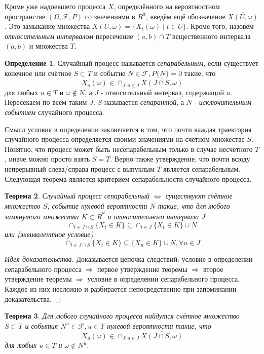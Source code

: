 \documentclass[16pt]{article}
\newtheorem{theorem}{Теорема}[section]
\theoremstyle{definition}
\newtheorem{definition}[theorem]{Определение}
\begin{document}
Кроме уже надоевшего процесса $X$, определённого на вероятностном пространстве $(\Omega, \mathcal{F}, P)$ со значениями в $R^d$, введём ещё обозначение $\overline{X(U, \omega)}$. Это замыкание множества $X(U, \omega) = \{X_t(\omega) \mid t \in U\}$. Кроме того, назовём \textit{относительным интервалом} пересечение $(a, b) \cap T$ вещественного интервала $(a, b)$ и множества $T$.

\begin{definition}
Случайный процесс называется \textit{сепарабельным}, если существует конечное или счётное $S \subset T$ и событие $N \in \mathcal{F}, P\{N\} = 0$ такие, что $$X_u(\omega) \in \cap_{J: u \in J} \overline{X(J \cap S, \omega)}$$ для любых $u \in T$ и $\omega \notin N$, а $J$ - относительный интервал, содержащий $u$. Пересекаем по всем таким $J$. $S$ называется \textit{сепарантой}, а $N$ - \textit{исключительным событием} случайного процесса.
\end{definition}
Смысл условия в определении заключается в том, что почти каждая траектория случайного процесса определяется своими значениями на счётном множестве $S$. Понятно, что процесс может быть несепарабельным только в случае несчётного $T$, иначе можно просто взять $S = T$. Верно также утверждение, что почти всюду непрерывный слева/справа процесс с выпуклым $T$ является сепарабельным.
Следующая теорема является критерием сепарабельности случайного процесса.
\begin{theorem}
Случайный процесс сепарабельный $\Longleftrightarrow$ существуют счётное множество $S$, событие нулевой вероятности $N$ такие, что для любого замкнутого множества $K \subset \overline{R}^d$ и относительного интервала $J$ $$\cap_{t \in J \cap S}\{X_t \in K\} \subseteq \cap_{t \in J}\{X_t \in K\} \cup N$$ или (эквивалентное условие) $$\cap_{t \in J \cap S}\{X_t \in K\} \subseteq \{X_u \in K\} \cup N, \forall u \in J$$
\end{theorem}
\begin{proof}[Идея доказательства]
Доказывается цепочка следствий: условие в определении сепарабельного процесса $\Longrightarrow$ первое утверждение теоремы $\Longrightarrow$ второе утверждение теоремы $\Longrightarrow$ условие в определении сепарабельного процесса. Каждое из них несложно и разбирается непосредственно при запоминании доказательства.
\end{proof}
\begin{theorem}
Для любого случайного процесса найдутся счётное множество $S \subset T$ и события $N^u \in \mathcal{F}, u \in T$ нулевой вероятности такие, что $$X_u(\omega) \in \cap_{J: u \in J} \overline{X(J \cap S, \omega)}$$ для любых $u \in T$ и $\omega \notin N^u$.
\end{theorem}
\end{document}
